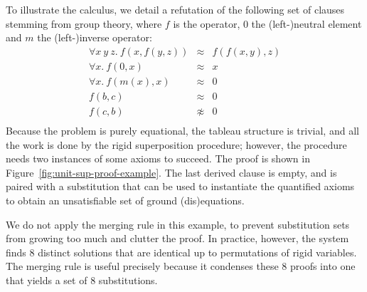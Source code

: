 To illustrate the calculus, we detail a refutation of the following set
of clauses stemming from group theory, where $f$ is the operator, $0$ the
(left-)neutral element and $m$ the (left-)inverse operator:
\[
  \begin{array}{rcl}
    \forall x~y~z.~ f(x,f(y,z)) &\approx& f(f(x,y),z) \\
    \forall x.~ f(0,x) &\approx& x \\
    \forall x.~ f(m(x),x) &\approx& 0 \\
    f(b,c) &\approx& 0 \\
    f(c,b) &\not\approx& 0 \\
  \end{array}
\]
Because the problem is purely equational, the tableau structure is trivial,
and all the work is done by the rigid superposition procedure;
however, the procedure needs two instances of some axioms to succeed.
The proof is shown in Figure~\ref{fig:unit-sup-proof-example}.
The last derived clause is empty, and is paired with a substitution
that can be used to instantiate the quantified axioms to obtain an
unsatisfiable set of ground (dis)equations.

We do not apply the merging rule in this example,
to prevent substitution sets from growing too much and clutter the proof.
In practice, however, the system finds 8 distinct solutions that are
identical up to permutations of rigid variables.
The merging rule is useful precisely because it condenses these 8 proofs
into one that yields a set of 8 substitutions.

